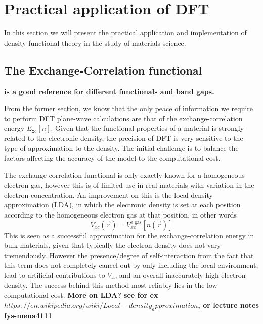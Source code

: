 \chapter{Practical application of DFT}
\label{sec:Practical DFT}

In this section we will present the practical application and implementation of density functional theory in the study of materials science.

\section{The Exchange-Correlation functional}
\textbf{\cite{XC_bandgap} is a good reference for different functionals and band gaps.}

From the former section, we know that the only peace of information we require to perform DFT plane-wave calculations are that of the exchange-correlation energy $E_{\text{xc}}[n]$. Given that the functional properties of a material is strongly related to the electronic density, the precision of DFT is very sensitive to the type of approximation to the density. The initial challenge is to balance the factors affecting the accuracy of the model to the computational cost.

The exchange-correlation functional is only exactly known for a homogeneous electron gas, however this is of limited use in real materials with variation in the electron concentration. An improvement on this is the local density approximation (LDA), in which the electronic density is set at each position according to the homogeneous electron gas at that position, in other words
\begin{equation}
    V_{xc}(\vec{r}) = V_{xc}^{\text{e gas}}[n(\vec{r})]
\end{equation}
This is seen as a successful approximation for the exchange-correlation energy in bulk materials, given that typically the electron density does not vary tremendously. However the presence/degree of self-interaction from the fact that this term does not completely cancel out by only including the local environment, lead to artificial contributions to $V_{xc}$ and an overall inaccurately high electron density. The success behind this method most reliably lies in the low computational cost. 
\textbf{More on LDA? see for ex $https://en.wikipedia.org/wiki/Local-density_approximation$, or lecture notes fys-mena4111}

